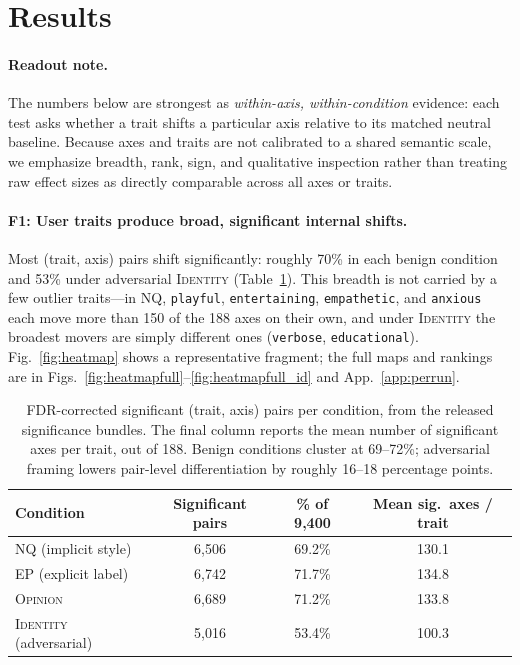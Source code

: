 \documentclass{article}
\newcommand{\ax}[1]{\texttt{#1}}   %
\begin{document}
\section{Results}
\label{sec:results}

\paragraph{Readout note.}
The numbers below are strongest as \emph{within-axis, within-condition} evidence: each test asks whether a trait shifts a particular axis relative to its matched neutral baseline. Because axes and traits are not calibrated to a shared semantic scale, we emphasize breadth, rank, sign, and qualitative inspection rather than treating raw effect sizes as directly comparable across all axes or traits.

\paragraph{F1: User traits produce broad, significant internal shifts.}
Most (trait, axis) pairs shift significantly: roughly 70\% in each benign condition and 53\% under adversarial \textsc{Identity} (Table~\ref{tab:sig}). This breadth is not carried by a few outlier traits---in \textsc{NQ}, \ax{playful}, \ax{entertaining}, \ax{empathetic}, and \ax{anxious} each move more than 150 of the 188 axes on their own, and under \textsc{Identity} the broadest movers are simply different ones (\ax{verbose}, \ax{educational}). Fig.~\ref{fig:heatmap} shows a representative fragment; the full maps and rankings are in Figs.~\ref{fig:heatmapfull}--\ref{fig:heatmapfull_id} and App.~\ref{app:perrun}.

\begin{table}[!htbp]
\centering
\begin{tabular}{lccc}
\toprule
Condition & Significant pairs & \% of 9{,}400 & Mean sig.\ axes / trait \\
\midrule
\textsc{NQ} (implicit style)      & 6{,}506 & 69.2\% & 130.1 \\
\textsc{EP} (explicit label)      & 6{,}742 & 71.7\% & 134.8 \\
\textsc{Opinion}                  & 6{,}689 & 71.2\% & 133.8 \\
\textsc{Identity} (adversarial)   & 5{,}016 & 53.4\% & 100.3 \\
\bottomrule
\end{tabular}
\caption{FDR-corrected significant (trait, axis) pairs per condition, from the released significance bundles. The final column reports the mean number of significant axes per trait, out of 188. Benign conditions cluster at 69--72\%; adversarial framing lowers pair-level differentiation by roughly 16--18 percentage points.}
\label{tab:sig}
\end{table}
\end{document}
